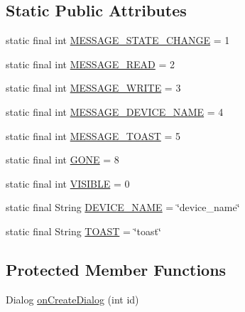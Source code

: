 \subsection*{Static Public Attributes}
\begin{DoxyCompactItemize}
\item 
static final int \hyperlink{classcom_1_1example_1_1android_1_1_bluetooth_chat_1_1_l_a_s_a_r_control_a54eaad8c061d8286ba78ae22323a4f2a}{M\-E\-S\-S\-A\-G\-E\-\_\-\-S\-T\-A\-T\-E\-\_\-\-C\-H\-A\-N\-G\-E} = 1
\item 
static final int \hyperlink{classcom_1_1example_1_1android_1_1_bluetooth_chat_1_1_l_a_s_a_r_control_ab0d2082ba2cfcb36adabfec0fb604e28}{M\-E\-S\-S\-A\-G\-E\-\_\-\-R\-E\-A\-D} = 2
\item 
static final int \hyperlink{classcom_1_1example_1_1android_1_1_bluetooth_chat_1_1_l_a_s_a_r_control_a1b526d54fa3f99e607ff4a1e17cfa136}{M\-E\-S\-S\-A\-G\-E\-\_\-\-W\-R\-I\-T\-E} = 3
\item 
static final int \hyperlink{classcom_1_1example_1_1android_1_1_bluetooth_chat_1_1_l_a_s_a_r_control_add64add7196452d793891b8d0805cb8f}{M\-E\-S\-S\-A\-G\-E\-\_\-\-D\-E\-V\-I\-C\-E\-\_\-\-N\-A\-M\-E} = 4
\item 
static final int \hyperlink{classcom_1_1example_1_1android_1_1_bluetooth_chat_1_1_l_a_s_a_r_control_aeb3b8c4dc7dfb4ee445d2d4afc5b65c0}{M\-E\-S\-S\-A\-G\-E\-\_\-\-T\-O\-A\-S\-T} = 5
\item 
static final int \hyperlink{classcom_1_1example_1_1android_1_1_bluetooth_chat_1_1_l_a_s_a_r_control_af184001c124497a8668c657a12086ec6}{G\-O\-N\-E} = 8
\item 
static final int \hyperlink{classcom_1_1example_1_1android_1_1_bluetooth_chat_1_1_l_a_s_a_r_control_ace98d3d6a968cb69d71e71476d37b8c0}{V\-I\-S\-I\-B\-L\-E} = 0
\item 
static final String \hyperlink{classcom_1_1example_1_1android_1_1_bluetooth_chat_1_1_l_a_s_a_r_control_aeb66e03c65cb4e4c8cecd9b5e9542612}{D\-E\-V\-I\-C\-E\-\_\-\-N\-A\-M\-E} = \char`\"{}device\-\_\-name\char`\"{}
\item 
static final String \hyperlink{classcom_1_1example_1_1android_1_1_bluetooth_chat_1_1_l_a_s_a_r_control_adafe8a0d70641fa1cab3d27fa09742e7}{T\-O\-A\-S\-T} = \char`\"{}toast\char`\"{}
\end{DoxyCompactItemize}
\subsection*{Protected Member Functions}
\begin{DoxyCompactItemize}
\item 
Dialog \hyperlink{classcom_1_1example_1_1android_1_1_bluetooth_chat_1_1_l_a_s_a_r_control_a3c6dd4273e9b563fbffdd8bad1cc6cf2}{on\-Create\-Dialog} (int id)
\end{DoxyCompactItemize}
